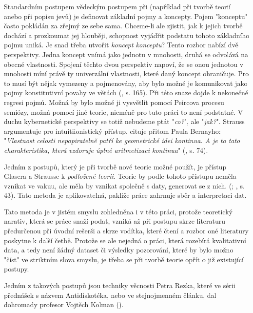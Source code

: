 \documentclass[11pt,a4paper]{article}
\begin{document}
Standardním postupem vědeckým postupem při (například při tvorbě teorií anebo při popisu jevů) je definovat základní pojmy a koncepty. Pojem "konceptu" často pokládán za zřejmý ze sebe sama. Chceme-li ale zjistit, jak k jejich tvorbě dochází a prozkoumat jej hlouběji, schopnost vyjádřit podstatu tohoto základního pojmu uniká. Je snad třeba utvořit \textit{koncept konceptu}? Tento rozbor nabízí dvě perspektivy. Jedna koncept vnímá jako jednotu v mnohosti, druhá se odvolává na obecné vlastnosti. Spojení těchto dvou perspektiv napoví, že se onou jednotou v mnohosti míní právě ty univerzální vlastnosti, které daný koncept ohraničuje. Pro to musí být nějak vymezeny a pojmenovány, aby bylo možné je komunikovat jako pojmy konstitutivní povahy ve větách (\cite{strauss_scope_2002}, s. 165). Při této snaze dojde k nekonečné regresi pojmů. Možná by bylo možné ji vysvětlit pomocí Peircova procesu semiózy, možná pomocí jiné teorie, nicméně pro tuto práci to není podstatné. V duchu kybernetické perspektivy se totiž nebudeme ptát "\textit{co?}", ale "\textit{jak?}". Strauss argumentuje pro intuitiionistický přístup, cituje přitom Paula Bernayho: "\textit{Vlastnost celosti nepopiratelně patří ke geometrické idei kontinua. A je to tato charakteristika, která vzdoruje úplné aritmetizaci kontinua}" (\cite{strauss_scope_2002, bernays_abhandlungen_1976}, s. 74). 

Jedním z postupů, který je při tvorbě nové teorie možné použít, je přístup Glasera a Strausse k \textit{podložené teorii}. Teorie by podle tohoto přístupu neměla vznikat ve vakuu, ale měla by vznikat společně s daty, generovat se z nich. (\cite{glaser_discovery_2017}; \cite{barbara_m_wildemuth_questions_2017}, s. 43). Tato metoda je aplikovatelná, pakliže práce zahrnuje sběr a interpretaci dat.

Tato metoda je v jistém smyslu zohledněna i v této práci, protože teoretický narativ, která se práce snaží podat, vzniká až při postupu skrze literaturu předurčenou při úvodní rešerši a skrze vodítka, které čtení a rozbor oné literatury poskytne k další četbě. Protože se ale nejedná o práci, která rozebírá kvalitativní data, a tedy není žádný dataset či výsledky pozorování, které by bylo možno "číst" ve striktním slova smyslu, je třeba se při tvorbě teorie opřít o již existující postupy.

Jedním z takových postupů jsou techniky věcnosti Petra Rezka, které ve sérii přednášek s názvem Antidiskotéka, nebo ve stejnojmenném článku, dal dohromady profesor Vojtěch Kolman (\cite{kolman_antidiskoteka_2022}). 
\end{document}
